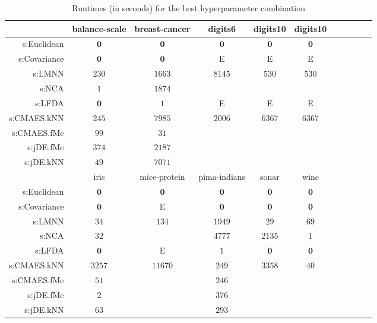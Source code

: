 \begin{table}[ht] \centering
{\small\renewcommand{\arraystretch}{1.0}
\setlength{\tabcolsep}{2pt}
\begin{tabular}{rcccccccccc}
\toprule


& \multicolumn{1}{c}{balance-scale} & \multicolumn{1}{c}{breast-cancer} & \multicolumn{1}{c}{digits6} & \multicolumn{1}{c}{digits10} & \multicolumn{1}{c}{digits10} \\ 
\midrule
s:Euclidean & $\bm{0}$ & $\bm{0}$ & $\bm{0}$ & $\bm{0}$ & $\bm{0}$ \\
s:Covariance & $\bm{0}$ & $\bm{0}$ & E  & E  & E  \\
s:LMNN & $230$ & $1663$ & $8145$ & $530$ & $530$ \\
s:NCA & $1$ & $1874$ &  &  &  \\
s:LFDA & $\bm{0}$ & $1$ & E  & E  & E  \\
s:CMAES.kNN & $245$ & $7985$ & $2006$ & $6367$ & $6367$ \\
s:CMAES.fMe & $99$ & $31$ &  &  &  \\
s:jDE.fMe & $374$ & $2187$ &  &  &  \\
s:jDE.kNN & $49$ & $7071$ &  &  &  \\
\midrule
& \multicolumn{1}{c}{iris} & \multicolumn{1}{c}{mice-protein} & \multicolumn{1}{c}{pima-indians} & \multicolumn{1}{c}{sonar} & \multicolumn{1}{c}{wine} \\ 
\midrule
s:Euclidean & $\bm{0}$ & $\bm{0}$ & $\bm{0}$ & $\bm{0}$ & $\bm{0}$ \\
s:Covariance & $\bm{0}$ & E  & $\bm{0}$ & $\bm{0}$ & $\bm{0}$ \\
s:LMNN & $34$ & $134$ & $1949$ & $29$ & $69$ \\
s:NCA & $32$ &  & $4777$ & $2135$ & $1$ \\
s:LFDA & $\bm{0}$ & E  & $1$ & $\bm{0}$ & $\bm{0}$ \\
s:CMAES.kNN & $3257$ & $11670$ & $249$ & $3358$ & $40$ \\
s:CMAES.fMe & $51$ &  & $246$ &  &  \\
s:jDE.fMe & $2$ &  & $376$ &  &  \\
s:jDE.kNN & $63$ &  & $293$ &  &  \\


\bottomrule
\end{tabular}
}
\caption{Runtimes (in seconds) for the best hyperparameter combination} \label{tab:runtimes}
\end{table}

